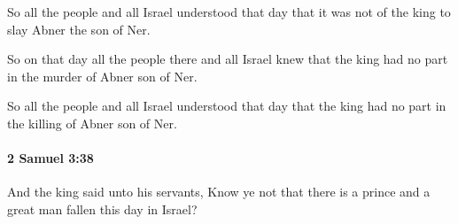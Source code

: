 			\begin{versebox}
					\item[BHS] 
					\item[ASV] So all the people and all Israel understood that day that it was not of the king to slay Abner the son of Ner.
					\item[NIV] So on that day all the people there and all Israel knew that the king had no part in the murder of Abner son of Ner.
					\item[NRSV] So all the people and all Israel understood that day that the king had no part in the killing of Abner son of Ner.
			\end{versebox}

		\paragraph{2 Samuel 3:38} %
			\label{2SAMUEL-3-38}

			And the king said unto his servants, Know ye not that there is a prince and a great man fallen this day in Israel?

